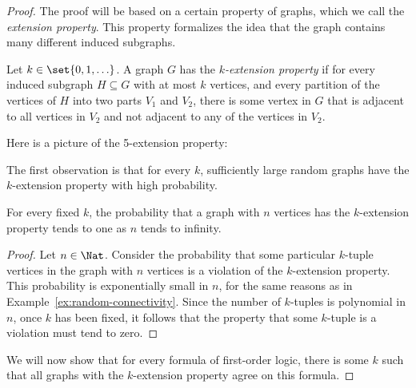 \begin{proof}
	The proof will be based on a certain property of graphs, which we call the \emph{extension property}. This property formalizes the idea that the graph contains many different induced subgraphs. 

\begin{definition} Let $k \in \set{0,1,\ldots}$. 
	A graph $G$ has the \emph{$k$-extension property} if for every induced subgraph $H \subseteq G$ with at most $k$ vertices, and every partition of the vertices of $H$ into two parts $V_1$ and $V_2$, there is some vertex in $G$ that is adjacent to all vertices in $V_2$ and not adjacent to any of the vertices in $V_2$.
\end{definition}
Here is a picture of the 5-extension property:

The first observation is that for every $k$, sufficiently large random graphs have the $k$-extension property with high probability.
\begin{lemma} \label{lem:k-extension-must-hold}
	For every fixed $k$, the probability that a graph with $n$ vertices has the $k$-extension property tends to one as $n$ tends to infinity.	
\end{lemma}
\begin{proof}
Let $n \in \Nat$. Consider the probability that some particular $k$-tuple vertices in the graph with $n$ vertices  is a violation of the $k$-extension property. This probability is  exponentially small in $n$, for the same reasons as in Example~\ref{ex:random-connectivity}. Since the number of $k$-tuples is polynomial in $n$, once $k$ has been fixed, it follows that the property that some $k$-tuple is a violation must tend to zero.
\end{proof}

We will now show that for every formula of first-order logic, there is some $k$ such that all graphs with the $k$-extension property agree on this formula. 



\end{proof}
